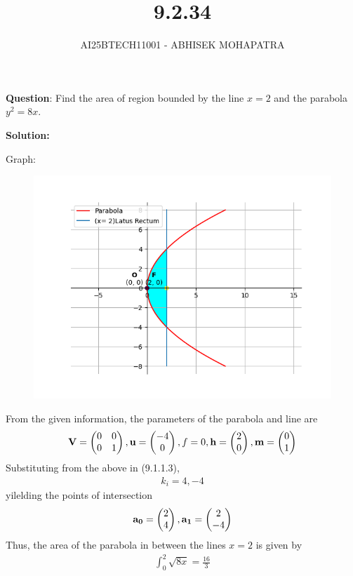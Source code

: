 \documentclass{beamer}
\title{9.2.34}
\author{AI25BTECH11001 - ABHISEK MOHAPATRA}
\numberwithin{equation}{section}
\begin{document}
{\let\newpage\relax\maketitle}
\renewcommand{\thefigure}{\theenumi}
\renewcommand{\thetable}{\theenumi}






	 	\textbf{Question}:
Find the area of region bounded by the line $x = 2$ and the parabola $y^2 = 8x$.

		\textbf{Solution:}

	Graph:
\begin{figure}[h!]
	\centering
	\includegraphics[width=0.7\linewidth]{img.png}
\end{figure}

From the given information, the parameters of the parabola and line are
\begin{align}
		\mathbf{V} = \begin{pmatrix}0&0\\0&1\end{pmatrix}, \mathbf{u} = \begin{pmatrix}-4\\0\end{pmatrix} , f = 0, \mathbf{h} =\begin{pmatrix}2\\0\end{pmatrix}, \mathbf{m}=\begin{pmatrix}0\\1\end{pmatrix} 
\end{align}
Substituting from the above in (9.1.1.3),
\begin{align}
k_i=4,-4
\end{align}
yilelding the points of intersection
\begin{align}
		\mathbf{a_0}=\begin{pmatrix}2\\4\end{pmatrix},\mathbf{a_1}=\begin{pmatrix}2\\-4\end{pmatrix}
\end{align}
Thus, the area of the parabola in between the lines $x = 2$ is given by
\begin{align}
\int_0^2 \sqrt{8x} = \frac{16}{3}
\end{align}
\end{document}
